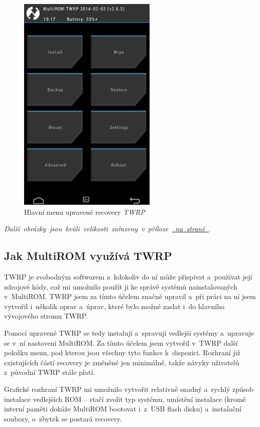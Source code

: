 \documentclass[12pt, a4paper, oneside]{article}
\newcommand{\It}{\textit}  %
\newcommand*{\attref}[1]{\hyperref[{#1}]{\uv{\nameref*{#1}} na straně \pageref{#1}}}
\begin{document}
\begin{figure}[H]
\begin{center}
 \includegraphics[width=250px]{img/recovery.png}
\caption{Hlavní menu upravené recovery \It{TWRP}}
\end{center}
\end{figure}
\vspace{-20pt}
\noindent \mbox{\It{Další obrázky jsou kvůli velikosti zařazeny v příloze \attref{obrazky}.}}

\subsection{Jak MultiROM využívá TWRP}
TWRP je svobodným softwarem a~kdokoliv do ní může přispívat a~používat její zdrojové kódy, což mi umožnilo použít ji ke správě systémů nainstalovaných v~MultiROM. TWRP jsem za tímto účelem značně upravil a~při práci na ní jsem vytvořil i~několik oprav a~úprav, které bylo možné zaslat i~do hlavního vývojového stromu TWRP.

Pomocí upravené TWRP se tedy instalují a~spravují vedlejší systémy a~upravuje se v~ní nastavení MultiROM. Za tímto účelem jsem vytvořil v~TWRP další položku menu, pod kterou jsou všechny tyto funkce k~dispozici. Rozhraní již existujících částí recovery je změněné jen minimálně, takže návyky uživatelů z~původní TWRP stále platí.

Grafické rozhraní TWRP mi umožnilo vytvořit relativně snadný a~rychlý způsob instalace vedlejších ROM -- stačí zvolit typ systému, umístění instalace (kromě interní paměti dokáže MultiROM bootovat i~z~USB flash disku) a~instalační soubory, o~zbytek se postará recovery.
\end{document}
